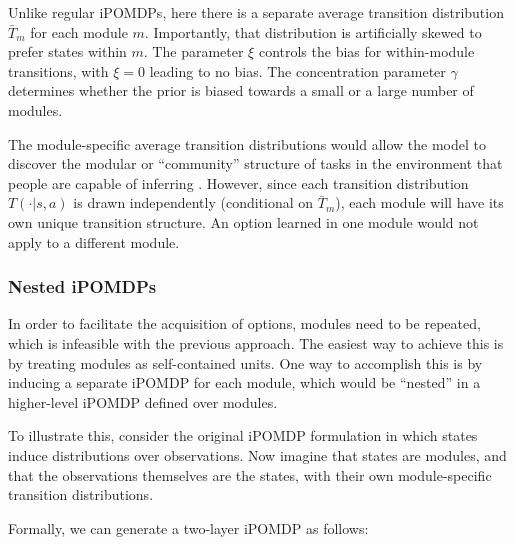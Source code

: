 \documentclass[11pt]{article}
\begin{document}
Unlike regular iPOMDPs, here there is a separate average transition distribution $\bar{T}_m$ for each module $m$. Importantly, that distribution is artificially skewed to prefer states within $m$. The parameter $\xi$ controls the bias for within-module transitions, with $\xi = 0$ leading to no bias. The concentration parameter $\gamma$ determines whether the prior is biased towards a small or a large number of modules.

The module-specific average transition distributions would allow the model to discover the modular or ``community'' structure of tasks in the environment that people are capable of inferring \cite{Schapiro2013, Solway2014}. However, since each transition distribution $T(\cdot|s,a)$ is drawn independently (conditional on $\bar{T}_m$), each module will have its own unique transition structure. An option learned in one module would not apply to a different module.

\subsubsection{Nested iPOMDPs}

In order to facilitate the acquisition of options, modules need to be repeated, which is infeasible with the previous approach. The easiest way to achieve this is by treating modules as self-contained units. One way to accomplish this is by inducing a separate iPOMDP for each module, which would be ``nested'' in a higher-level iPOMDP defined over modules.

To illustrate this, consider the original iPOMDP formulation in which states induce distributions over observations. Now imagine that states are modules, and that the observations themselves are the states, with their own module-specific transition distributions.

Formally, we can generate a two-layer iPOMDP as follows:
\end{document}
